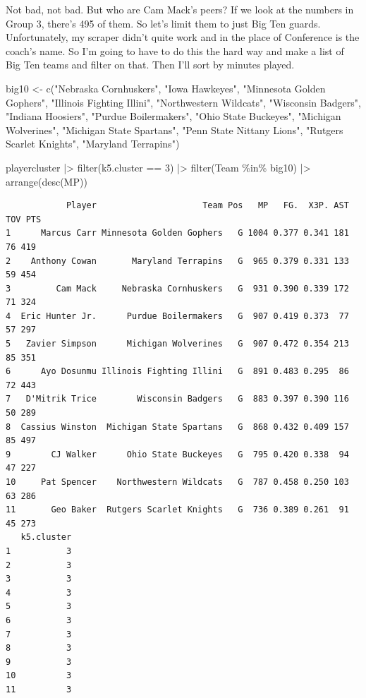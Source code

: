 \documentclass[
  letterpaper,
  DIV=11,
  numbers=noendperiod]{scrreprt}
\newenvironment{Shaded}{\begin{snugshade}}{\end{snugshade}}
\newcommand{\DecValTok}[1]{\textcolor[rgb]{0.68,0.00,0.00}{#1}}
\newcommand{\FunctionTok}[1]{\textcolor[rgb]{0.28,0.35,0.67}{#1}}
\newcommand{\NormalTok}[1]{\textcolor[rgb]{0.00,0.23,0.31}{#1}}
\newcommand{\OtherTok}[1]{\textcolor[rgb]{0.00,0.23,0.31}{#1}}
\newcommand{\SpecialCharTok}[1]{\textcolor[rgb]{0.37,0.37,0.37}{#1}}
\newcommand{\StringTok}[1]{\textcolor[rgb]{0.13,0.47,0.30}{#1}}
\begin{document}
Not bad, not bad. But who are Cam Mack's peers? If we look at the
numbers in Group 3, there's 495 of them. So let's limit them to just Big
Ten guards. Unfortunately, my scraper didn't quite work and in the place
of Conference is the coach's name. So I'm going to have to do this the
hard way and make a list of Big Ten teams and filter on that. Then I'll
sort by minutes played.

\begin{Shaded}
\begin{Highlighting}[]
\NormalTok{big10 }\OtherTok{\textless{}{-}} \FunctionTok{c}\NormalTok{(}\StringTok{"Nebraska Cornhuskers"}\NormalTok{, }\StringTok{"Iowa Hawkeyes"}\NormalTok{, }\StringTok{"Minnesota Golden Gophers"}\NormalTok{, }\StringTok{"Illinois Fighting Illini"}\NormalTok{, }\StringTok{"Northwestern Wildcats"}\NormalTok{, }\StringTok{"Wisconsin Badgers"}\NormalTok{, }\StringTok{"Indiana Hoosiers"}\NormalTok{, }\StringTok{"Purdue Boilermakers"}\NormalTok{, }\StringTok{"Ohio State Buckeyes"}\NormalTok{, }\StringTok{"Michigan Wolverines"}\NormalTok{, }\StringTok{"Michigan State Spartans"}\NormalTok{, }\StringTok{"Penn State Nittany Lions"}\NormalTok{, }\StringTok{"Rutgers Scarlet Knights"}\NormalTok{, }\StringTok{"Maryland Terrapins"}\NormalTok{)}

\NormalTok{playercluster }\SpecialCharTok{|\textgreater{}} \FunctionTok{filter}\NormalTok{(k5.cluster }\SpecialCharTok{==} \DecValTok{3}\NormalTok{) }\SpecialCharTok{|\textgreater{}} \FunctionTok{filter}\NormalTok{(Team }\SpecialCharTok{\%in\%}\NormalTok{ big10) }\SpecialCharTok{|\textgreater{}} \FunctionTok{arrange}\NormalTok{(}\FunctionTok{desc}\NormalTok{(MP))}
\end{Highlighting}
\end{Shaded}

\begin{verbatim}
            Player                     Team Pos   MP   FG.  X3P. AST TOV PTS
1      Marcus Carr Minnesota Golden Gophers   G 1004 0.377 0.341 181  76 419
2    Anthony Cowan       Maryland Terrapins   G  965 0.379 0.331 133  59 454
3         Cam Mack     Nebraska Cornhuskers   G  931 0.390 0.339 172  71 324
4  Eric Hunter Jr.      Purdue Boilermakers   G  907 0.419 0.373  77  57 297
5   Zavier Simpson      Michigan Wolverines   G  907 0.472 0.354 213  85 351
6      Ayo Dosunmu Illinois Fighting Illini   G  891 0.483 0.295  86  72 443
7   D'Mitrik Trice        Wisconsin Badgers   G  883 0.397 0.390 116  50 289
8  Cassius Winston  Michigan State Spartans   G  868 0.432 0.409 157  85 497
9        CJ Walker      Ohio State Buckeyes   G  795 0.420 0.338  94  47 227
10     Pat Spencer    Northwestern Wildcats   G  787 0.458 0.250 103  63 286
11       Geo Baker  Rutgers Scarlet Knights   G  736 0.389 0.261  91  45 273
   k5.cluster
1           3
2           3
3           3
4           3
5           3
6           3
7           3
8           3
9           3
10          3
11          3
\end{verbatim}
\end{document}
